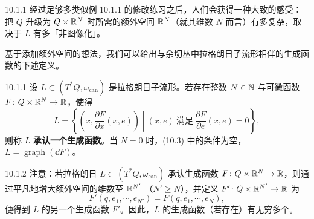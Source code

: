 \begin{wrem}{10.1.1}
  经过足够多类似例 10.1.1 的修改练习之后，人们会获得一种大致的感受：把 $Q$ 升级为
  $Q\times\mathbb{R}^N$ 时所需的额外空间 $\mathbb{R}^N$（就其维数 $N$ 而言）有多复杂，取决于 $L$
  有多「非图像化」。
\end{wrem}


基于添加额外空间的想法，我们可以给出与余切丛中拉格朗日子流形相伴的生成函数的下述定义。

\begin{wdefn}{10.1.1}
  设 $L\subset(T^*Q,\omega_{\mathrm{can}})$ 是拉格朗日子流形。若存在整数 $N\in\mathbb{N}$
  与可微函数 $F\colon Q\times\mathbb{R}^N\to\mathbb{R}$，使得
  \begin{equation}\tag{10.3}
    L=\left\{\left.\left(x,\frac{\partial F}{\partial x}(x,e)\right)
    \;\right|\;(x,e)\ \text{满足}\
    \frac{\partial F}{\partial e}(x,e)=0\right\},
  \end{equation}
  则称 $L$ \textbf{承认一个生成函数}。当 $N=0$ 时，(10.3) 中的条件为空，
  $L=\operatorname{graph}(\dd F)$。
\end{wdefn}


\begin{wrem}{10.1.2}
  注意：若拉格朗日 $L\subset(T^*Q,\omega_{\mathrm{can}})$ 承认生成函数
  $F\colon Q\times\mathbb{R}^N\to\mathbb{R}$，则通过平凡地增大额外空间的维数至 $\mathbb{R}^{N'}$
  （$N'\ge N$），并定义 $F'\colon Q\times\mathbb{R}^{N'}\to\mathbb{R}$ 为
  \[
    F'(q,e_1,\cdots,e_{N'})=F(q,e_1,\cdots,e_N),
  \]
  便得到 $L$ 的另一个生成函数 $F'$。因此，$L$ 的生成函数（若存在）有无穷多个。
\end{wrem}

